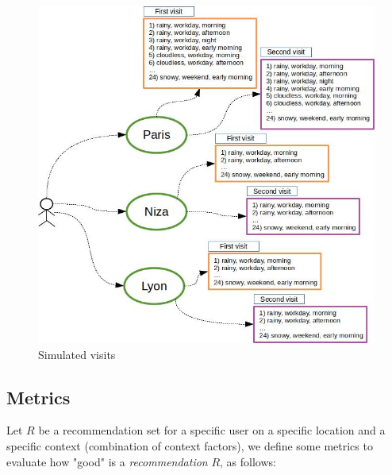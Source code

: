 \begin{figure}[h]
\centering
\includegraphics[scale=0.5]{draws/experiments.jpg}
\caption{Simulated visits}
\label{fig:experiments}
\end{figure}

\subsection{Metrics} \label{section:metrics}

Let $R$ be a recommendation set for a specific user on a specific location and a specific context (combination of context factors),
we define some metrics to evaluate how "good" is a \textit{recommendation} $R$, as follows:

